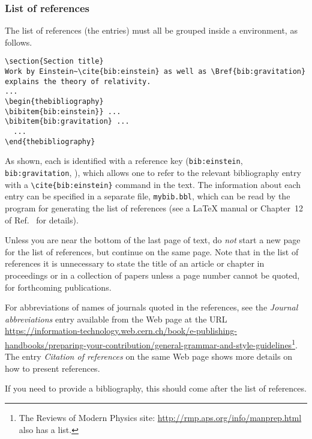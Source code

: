 \documentclass{cernrep}
\begin{document}
\subsubsection{List of references}

The list of references (the  entries) must all be grouped
inside a  environment, as follows.

\begin{verbatim}
\section{Section title}
Work by Einstein~\cite{bib:einstein} as well as \Bref{bib:gravitation}
explains the theory of relativity.
...
\begin{thebibliography}
\bibitem{bib:einstein}} ...
\bibitem{bib:gravitation} ...
  ...
\end{thebibliography}
\end{verbatim}
As shown, each  is identified with a reference key
(\texttt{bib:einstein}, \texttt{bib:gravitation}, \etc), which allows
one to refer to the relevant bibliography entry with a
\verb|\cite{bib:einstein}| command in the text. The information about
each entry can be specified in a separate file, \eg
\texttt{mybib.bbl}, which can be read by the \BibTeX{} program for
generating the list of references (see a \LaTeX{} manual or Chapter~12
of Ref.~\cite{bib:mittelbach2004} for details).

Unless you are near the bottom of the last page of text, do \emph{not}
start a new page for the list of references, but continue on the same
page. Note that in the list of references it is unnecessary to state
the title of an article or chapter in proceedings or in a collection
of papers unless a page number cannot be quoted, \eg for forthcoming
publications.

For abbreviations of names of journals quoted in the references, see
the \emph{Journal abbreviations} entry available from the Web page at
the URL\\
\url{https://information-technology.web.cern.ch/book/e-publishing-handbooks/preparing-your-contribution/general-grammar-and-style-guidelines}\footnote{The Reviews of Modern Physics site: \url{http://rmp.aps.org/info/manprep.html}
also has a list.}. The entry \emph{Citation of references} on the same
Web page shows more details on how to present references.

If you need to provide a bibliography, this should come after the list
of references.
\end{document}
